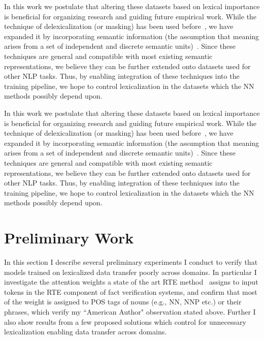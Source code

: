 \documentclass[compsoc,onecolumn]{IEEEtran}
\begin{document}
 
In this work we postulate that altering these datasets based on lexical importance is beneficial for organizing research and guiding future empirical work. While the technique of delexicalization (or masking) has been used before~\cite{zeman2008cross}, we have expanded it by incorporating semantic information (the assumption that meaning arises from a set of independent and discrete semantic units)~\cite{peyrard2019simple}. Since these techniques are general and compatible with most existing semantic representations, we believe they can be further extended onto datasets used for other NLP tasks. Thus, by enabling integration of these techniques into the training pipeline, we hope to control lexicalization in the datasets which the NN methods possibly depend upon. 



 
In this work we postulate that altering these datasets based on lexical importance is beneficial for organizing research and guiding future empirical work. While the technique of delexicalization (or masking) has been used before~\cite{zeman2008cross}, we have expanded it by incorporating semantic information (the assumption that meaning arises from a set of independent and discrete semantic units)~\cite{peyrard2019simple}. Since these techniques are general and compatible with most existing semantic representations, we believe they can be further extended onto datasets used for other NLP tasks. Thus, by enabling integration of these techniques into the training pipeline, we hope to control lexicalization in the datasets which the NN methods possibly depend upon. 


\section{Preliminary Work}


In this section I describe several preliminary experiments I conduct to verify that models trained on lexicalized data transfer poorly across domains. In particular I investigate the attention weights a state of the art RTE method~\cite{parikh2016decomposable} assigns to input tokens in the RTE component of fact verification systems, and confirm that most of the weight is assigned to POS tags of nouns (e.g., NN, NNP etc.) or their phrases, which verify my ``American Author" observation stated above. Further I also show results from a few proposed solutions which control for unnecessary lexicalization enabling data transfer across domains.
\end{document}
